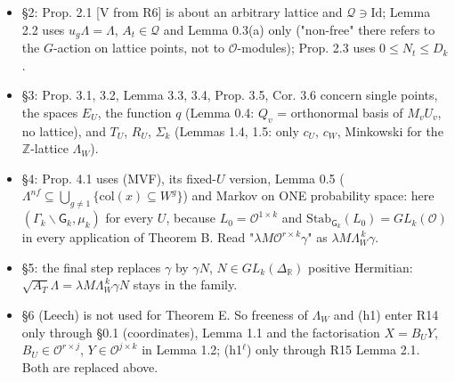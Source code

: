 \begin{itemize}
\tightlist
\item
  §2: Prop. 2.1 {[}V from R6{]} is about an arbitrary lattice and \(\mathcal Q\ni\mathrm{Id}\); Lemma 2.2 uses \(u_g\Lambda=\Lambda\), \(A_t\in\mathcal Q\) and Lemma 0.3(a) only ("non-free" there refers to the \(G\)-action on lattice points, not to \(\mathcal O\)-modules); Prop. 2.3 uses \(0\le N_t\le D_k\).
\item
  §3: Prop. 3.1, 3.2, Lemma 3.3, 3.4, Prop. 3.5, Cor. 3.6 concern single points, the spaces \(E_U\), the function \(q\) (Lemma 0.4: \(Q_v\) = orthonormal basis of \(M_vU_v\), no lattice), and \(T_U\), \(R_U\), \(\Sigma_k\) (Lemmas 1.4, 1.5: only \(c_U\), \(c_W\), Minkowski for the \(\mathbb Z\)-lattice \(\Lambda_W\)).
\item
  §4: Prop. 4.1 uses (MVF), its fixed-\(U\) version, Lemma 0.5 (\(\Lambda^{nf}\subseteq\bigcup_{g\ne1}\{\mathrm{col}(x)\subseteq W^g\}\)) and Markov on ONE probability space: here \((\Gamma_k\backslash\mathsf G_k,\mu_k)\) for every \(U\), because \(L_0=\mathcal O^{1\times k}\) and \(\mathrm{Stab}_{\mathsf G_k}(L_0)=GL_k(\mathcal O)\) in every application of Theorem B. Read "\(\lambda M\mathcal O^{r\times k}\gamma\)" as \(\lambda M\Lambda_W^{\,k}\gamma\).
\item
  §5: the final step replaces \(\gamma\) by \(\gamma N\), \(N\in GL_k(\Delta_{\mathbb R})\) positive Hermitian: \(\sqrt{A_T}\Lambda=\lambda M\Lambda_W^{\,k}\gamma N\) stays in the family.
\item
  §6 (Leech) is not used for Theorem E\textquotesingle.
  So freeness of \(\Lambda_W\) and (h1) enter R14 only through §0.1 (coordinates), Lemma 1.1 and the factorisation \(X=B_UY\), \(B_U\in\mathcal O^{r\times j}\), \(Y\in\mathcal O^{j\times k}\) in Lemma 1.2; (h1\(^\ell\)) only through R15 Lemma 2.1. Both are replaced above.
\end{itemize}

